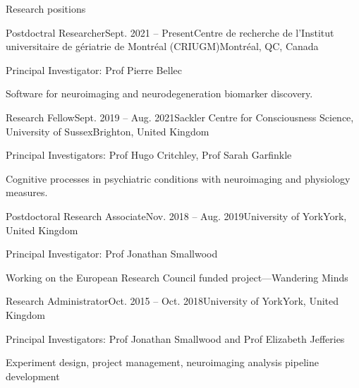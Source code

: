 \documentclass{resume} %
\begin{document}
%



\begin{rSection}{Research positions}

  \begin{rSubsection}{Postdoctral Researcher}{Sept. 2021 -- Present}{Centre de recherche de l'Institut universitaire de g\'eriatrie de Montr\'eal (CRIUGM)}{Montr\'eal, QC, Canada}
    \item Principal Investigator: Prof Pierre Bellec
    \item Software for neuroimaging and neurodegeneration biomarker discovery.
  \end{rSubsection}

  \begin{rSubsection}{Research Fellow}{Sept. 2019 -- Aug. 2021}{Sackler Centre for Consciousness Science, University of Sussex}{Brighton, United Kingdom}
    \item Principal Investigators: Prof Hugo Critchley, Prof Sarah Garfinkle
    \item Cognitive processes in psychiatric conditions with neuroimaging and physiology measures.
  \end{rSubsection}

  \begin{rSubsection}{Postdoctoral Research Associate}{Nov. 2018 -- Aug. 2019}{University of York}{York, United Kingdom}
  \item Principal Investigator: Prof Jonathan Smallwood
  \item Working on the European Research Council funded project---Wandering Minds
  \end{rSubsection}

  \begin{rSubsection}{Research Administrator}{Oct. 2015 -- Oct. 2018}{University of York}{York, United Kingdom}
    \item Principal Investigators: Prof Jonathan Smallwood and Prof Elizabeth Jefferies
    \item Experiment design, project management, neuroimaging analysis pipeline development
  \end{rSubsection}

  \end{rSection}
\end{document}
